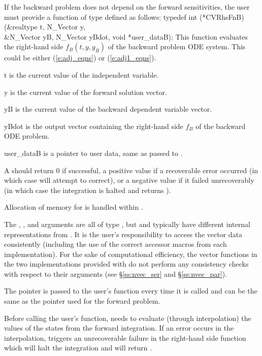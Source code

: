 If the backward problem does not depend on the forward sensitivities,
the user must provide a  function of type  defined as follows:
{
  typedef int (*CVRhsFnB)(&realtype t, N\_Vector y, \\
                          &N\_Vector yB, N\_Vector yBdot, void *user\_dataB);
}
{
  This function evaluates the right-hand side $f_B(t,y,y_B)$ of the backward problem
  ODE system.  This could be either (\ref{e:adj_eqns}) or (\ref{e:adj1_eqns}).
}
{
  \begin{args}
  \item[t]
    is the current value of the independent variable.
  \item[y]
    is the current value of the forward solution vector.
  \item[yB]
    is the current value of the backward dependent variable vector.
  \item[yBdot]
    is the output vector containing the right-hand side $f_B$ of the backward ODE problem.
  \item[user\_dataB]
    is a pointer to user data, same as passed to .
  \end{args}
}
{
  A  should return 0 if successful, a positive value if a recoverable
  error occurred (in which case {\cvodes} will attempt to correct), or a negative 
  value if it failed unrecoverably (in which case the integration is halted and
   returns ).
}
{
  Allocation of memory for  is handled within {\cvodes}.

  The , , and  arguments are all 
  of type , but  and  typically have 
  different internal representations from . It is the user's 
  responsibility to access the vector data consistently (including the use of the 
  correct accessor macros from each {\nvector} implementation). For the sake of 
  computational efficiency, the vector functions in the two {\nvector} implementations 
  provided with {\cvodes} do not perform any consistency checks with respect to their 
   arguments (see \S\ref{ss:nvec_ser} and \S\ref{ss:nvec_par}).

  The  pointer is passed to 
  the user's  function every time it is called and can be the same as the 
   pointer used for the forward problem.

  {\warn}Before calling the user's  function, {\cvodes} needs to evaluate
  (through interpolation) the values of the states from the forward integration. 
  If an error occurs in the interpolation, {\cvodes} triggers an unrecoverable
  failure in the right-hand side function which will halt the integration and
   will return .
}

